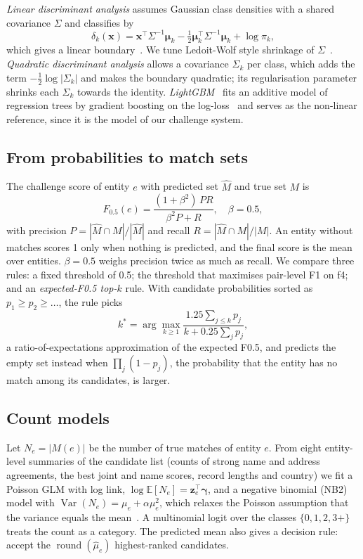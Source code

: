 \emph{Linear discriminant analysis} assumes Gaussian class densities with a shared covariance $\Sigma$ and classifies by
\begin{equation}
\delta_k(\mathbf{x})=\mathbf{x}^{\top}\Sigma^{-1}\boldsymbol\mu_k-\tfrac12\boldsymbol\mu_k^{\top}\Sigma^{-1}\boldsymbol\mu_k+\log\pi_k ,
\end{equation}
which gives a linear boundary~\cite{fisher1936,hastie2009}. We tune Ledoit-Wolf style shrinkage of
$\Sigma$~\cite{ledoit2004}. \emph{Quadratic discriminant analysis} allows a covariance $\Sigma_k$ per class, which
adds the term $-\tfrac12\log|\Sigma_k|$ and makes the boundary quadratic; its regularisation parameter shrinks
each $\Sigma_k$ towards the identity. \emph{LightGBM}~\cite{ke2017} fits an additive model of regression trees by
gradient boosting on the log-loss~\cite{friedman2001} and serves as the non-linear reference, since it is the model
of our challenge system.

\subsection{From probabilities to match sets}
The challenge score of entity $e$ with predicted set $\hat M$ and true set $M$ is
\begin{equation}
F_{0.5}(e)=\frac{(1+\beta^2)\,PR}{\beta^2P+R},\quad \beta=0.5,
\end{equation}
with precision $P=|\hat M\cap M|/|\hat M|$ and recall $R=|\hat M\cap M|/|M|$. An entity without matches scores 1
only when nothing is predicted, and the final score is the mean over entities. $\beta=0.5$ weighs precision twice
as much as recall. We compare three rules: a fixed threshold of 0.5; the threshold that maximises pair-level F1 on
f4; and an \emph{expected-F0.5 top-$k$} rule. With candidate probabilities sorted as $p_1\ge p_2\ge\dots$, the
rule picks
\begin{equation}
k^{*}=\arg\max_{k\ge 1}\frac{1.25\sum_{j\le k}p_j}{k+0.25\sum_j p_j},
\end{equation}
a ratio-of-expectations approximation of the expected F0.5, and predicts the empty set instead when
$\prod_j(1-p_j)$, the probability that the entity has no match among its candidates, is larger.

\subsection{Count models}
Let $N_e=|M(e)|$ be the number of true matches of entity $e$. From eight entity-level summaries of the candidate
list (counts of strong name and address agreements, the best joint and name scores, record lengths and country) we
fit a Poisson GLM with log link, $\log \mathbb{E}[N_e]=\mathbf{z}_e^{\top}\boldsymbol\gamma$, and a negative
binomial (NB2) model with $\operatorname{Var}(N_e)=\mu_e+\alpha\mu_e^2$, which relaxes the Poisson assumption
that the variance equals the mean~\cite{cameron2013}. A multinomial logit over the classes $\{0,1,2,3{+}\}$ treats
the count as a category. The predicted mean also gives a decision rule: accept the $\operatorname{round}(\hat\mu_e)$
highest-ranked candidates.

